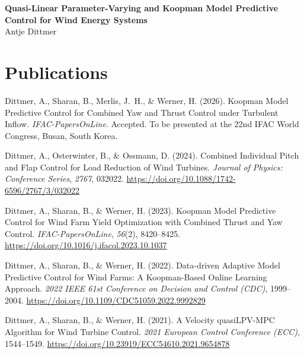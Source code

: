 \documentclass[11pt,a4paper]{article}
\begin{document}
    
    \begin{center}
        {\Large \textbf{Quasi-Linear Parameter-Varying and Koopman Model Predictive Control for Wind Energy Systems}}\\[0.5cm]
        Antje Dittmer
    \end{center}
    
   \section*{Publications}
   
   \begin{description}[leftmargin=0pt]
       
       \item Dittmer, A., Sharan, B., Merlis, J.~H., \& Werner, H. (2026).
       Koopman Model Predictive Control for Combined Yaw and Thrust Control
       under Turbulent Inflow.
       \textit{IFAC-PapersOnLine}.
       Accepted. To be presented at the 22nd IFAC World Congress, Busan, South Korea.
       
       \item Dittmer, A., Osterwinter, B., \& Ossmann, D. (2024).
       Combined Individual Pitch and Flap Control for Load Reduction
       of Wind Turbines.
       \textit{Journal of Physics: Conference Series}, \textit{2767}, 032022.
       \url{https://doi.org/10.1088/1742-6596/2767/3/032022}
       
       \item Dittmer, A., Sharan, B., \& Werner, H. (2023).
       Koopman Model Predictive Control for Wind Farm Yield Optimization
       with Combined Thrust and Yaw Control.
       \textit{IFAC-PapersOnLine}, \textit{56}(2), 8420--8425.
       \url{https://doi.org/10.1016/j.ifacol.2023.10.1037}
       
       \item Dittmer, A., Sharan, B., \& Werner, H. (2022).
       Data-driven Adaptive Model Predictive Control for Wind Farms:
       A Koopman-Based Online Learning Approach.
       \textit{2022 IEEE 61st Conference on Decision and Control (CDC)}, 1999--2004.
       \url{https://doi.org/10.1109/CDC51059.2022.9992829}
       
       \item Dittmer, A., Sharan, B., \& Werner, H. (2021).
       A Velocity quasiLPV-MPC Algorithm for Wind Turbine Control.
       \textit{2021 European Control Conference (ECC)}, 1544--1549.
       \url{https://doi.org/10.23919/ECC54610.2021.9654878}
       
   \end{description}
   
\end{document}
